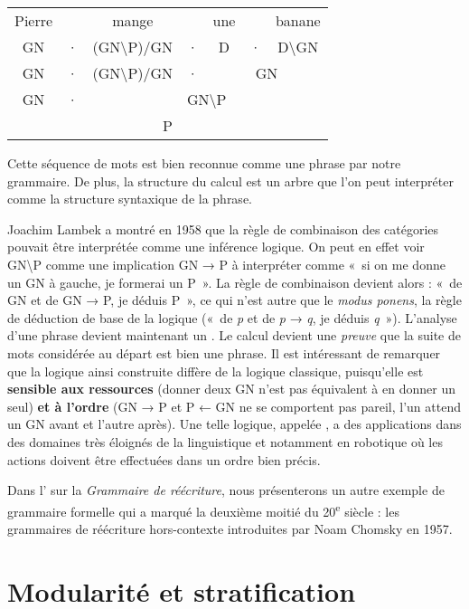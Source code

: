 {\ea
   \settowidth{\tabcolsep}{~}
   \begin{tabular}[t]{@{}c c c c c c c@{}}
    {Pierre} &   &  {mange} & &    {une} & &  {banane}\\
    GN       & · & (GN{\textbackslash}P)/GN & · & D & · & D{\textbackslash}GN\\\cmidrule{5-7}
    GN       & · & (GN{\textbackslash}P)/GN & · & \multicolumn{3}{c}{GN}\\\cmidrule{3-7}
    GN       & · & \multicolumn{5}{c}{GN{\textbackslash}P}\\\midrule
    \multicolumn{7}{c}{P}
   \end{tabular}
\z


    Cette séquence de mots est bien reconnue comme une phrase par notre grammaire. De plus, la structure du calcul est un arbre que l’on peut interpréter comme la structure syntaxique de la phrase.

    Joachim Lambek a montré en 1958 que la règle de combinaison des catégories pouvait être interprétée comme une inférence logique. On peut en effet voir GN{\textbackslash}P comme une implication GN → P à interpréter comme «~si on me donne un GN à gauche, je formerai un P~». La règle de combinaison devient alors : «~de GN et de GN → P, je déduis P~», ce qui n’est autre que le \textit{modus ponens}, la règle de déduction de base de la logique («~de \textit{p} et de \textit{p} → \textit{q}, je déduis \textit{q}~»). L’analyse d’une phrase devient maintenant un . Le calcul devient une \textit{preuve} que la suite de mots considérée au départ est bien une phrase. Il est intéressant de remarquer que la logique ainsi construite diffère de la logique classique, puisqu’elle est \textbf{sensible aux ressources} (donner deux GN n’est pas équivalent à en donner un seul) \textbf{et à l’ordre} (GN → P et P ← GN ne se comportent pas pareil, l’un attend un GN avant et l’autre après). Une telle logique, appelée , a des applications dans des domaines très éloignés de la linguistique et notamment en robotique où les actions doivent être effectuées dans un ordre bien précis.

    Dans l’ sur la \textit{Grammaire de réécriture}, nous présenterons un autre exemple de grammaire formelle qui a marqué la deuxième moitié du 20\textsuperscript{e} siècle : les grammaires de réécriture hors-contexte introduites par Noam Chomsky en 1957.
}
\section{Modularité et stratification}\label{sec:1.3.8}

